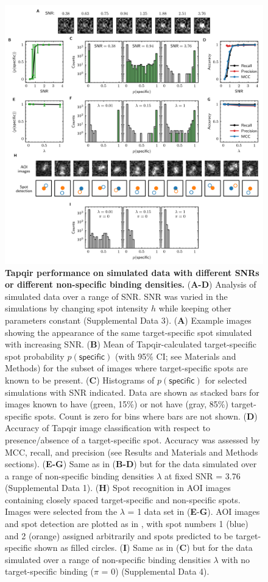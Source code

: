 \begin{figure}
\begin{fullwidth}
\includegraphics[width=183mm]{figures/tapqir_performance.png}
\caption{\textbf{Tapqir performance on simulated data with different SNRs or different non-specific binding densities.} (\textbf{A-D}) Analysis of simulated data over a range of SNR. SNR was varied in the simulations by changing spot intensity  $h$ while keeping other parameters constant (Supplemental Data 3). (\textbf{A}) Example images showing the appearance of the same target-specific spot simulated with increasing SNR.   (\textbf{B}) Mean of Tapqir-calculated target-specific spot probability $p(\mathsf{specific})$ (with 95\% CI; see Materials and Methods) for the subset of images where target-specific spots  are known to be present. (\textbf{C}) Histograms of $p(\mathsf{specific})$ for selected simulations with SNR indicated. Data are shown as stacked bars for images known to have (green, 15\%) or not have (gray, 85\%) target-specific spots.  Count is zero for bins where bars are not shown. (\textbf{D}) Accuracy of Tapqir image classification with respect to presence/absence of a target-specific spot. Accuracy was assessed by MCC, recall, and precision (see Results and Materials and Methods sections). (\textbf{E-G}) Same as in (\textbf{B-D}) but for the data simulated over a range of non-specific binding densities $\lambda$ at fixed SNR = 3.76 (Supplemental Data 1). (\textbf{H}) Spot recognition in AOI images containing closely spaced target-specific and non-specific spots.  Images were selected from the $\lambda$ = 1 data set in (\textbf{E}-\textbf{G}). AOI images and spot detection are plotted as in , with spot numbers 1 (blue) and 2 (orange) assigned arbitrarily and spots predicted to be target-specific shown as filled circles. (\textbf{I}) Same as in (\textbf{C}) but for the data simulated over a range of non-specific binding densities $\lambda$ with no target-specific binding ($\pi$ = 0) (Supplemental Data 4).}

\end{fullwidth}
\end{figure}
